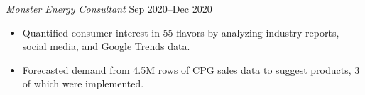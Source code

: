 \textit{Monster Energy Consultant} \hfill Sep 2020--Dec 2020
\begin{itemize}
	\item Quantified consumer interest in 55 flavors by analyzing industry reports, social media, and Google Trends data.
	\item Forecasted demand from 4.5M rows of CPG sales data to suggest products, 3 of which were implemented.
\end{itemize}\par